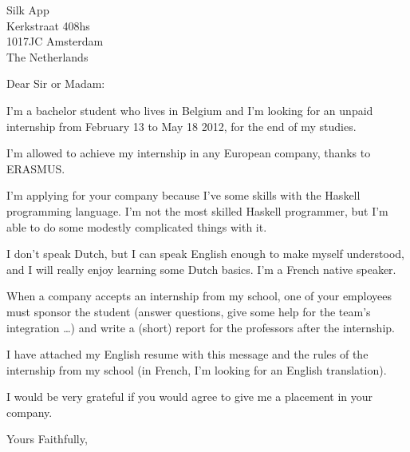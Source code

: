 \documentclass[a4paper,11pt]{letter}
\begin{document}
\begin{letter}{Silk App \\ Kerkstraat 408hs \\ 1017JC Amsterdam \\ The
Netherlands}

\opening{Dear Sir or Madam:}

I'm a bachelor student who lives in Belgium and I'm looking for an unpaid
internship from February 13 to May 18 2012, for the end of my studies.

I'm allowed to achieve my internship in any European company, thanks to
ERASMUS.

I'm applying for your company because I've some skills with the Haskell
programming language. I'm not the most skilled Haskell programmer, but I'm able
to do some modestly complicated things with it.

I don't speak Dutch, but I can speak English enough to make myself understood,
and I will really enjoy learning some Dutch basics. I'm a French native speaker.

When a company accepts an internship from my school, one of your employees must
sponsor the student (answer questions, give some help for the team's integration
\dots) and write a (short) report for the professors after the internship.

I have attached my English resume with this message and the rules of the
internship from my school (in French, I'm looking for an English translation).

I would be very grateful if you would agree to give me a placement in your
company.

\closing{Yours Faithfully,}

\end{letter}
\end{document}
